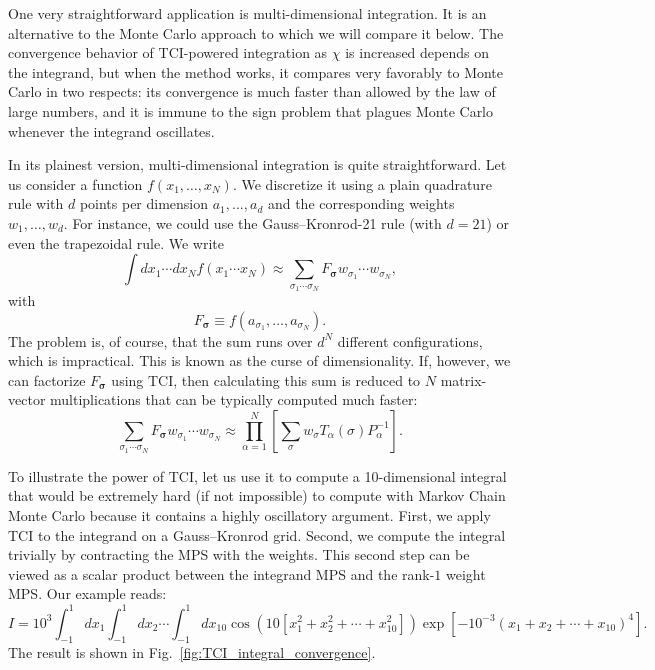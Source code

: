\documentclass{SciPost}
\begin{document}
One very straightforward application is multi-dimensional integration. It is an alternative to the Monte Carlo approach to which we will compare it below. The convergence behavior of TCI-powered integration as $\chi$ is increased depends on the integrand, but when the method works, it compares very favorably to Monte Carlo in two respects: its convergence is much faster than allowed by the law of large numbers, and it is immune to the sign problem that plagues Monte Carlo whenever the integrand oscillates.

In its plainest version, multi-dimensional integration is quite straightforward.
Let us consider a function $f(x_1,\ldots,x_N)$. We discretize it using a plain quadrature rule
with $d$ points per dimension $a_1, \ldots, a_d$ and the corresponding weights $w_1, \ldots, w_d$.
For instance, we could use the Gauss--Kronrod-21 rule (with $d=21$) or even the trapezoidal rule. We write
\begin{equation}
\int dx_1\cdots{}dx_N f(x_1\cdots{}x_N) \approx \sum_{\sigma_1\cdots{}\sigma_N} F_\mathbf{\sigma}
w_{\sigma_1}\cdots{}w_{\sigma_N},
\end{equation}
with
\begin{equation}
F_\mathbf{\sigma} \equiv f(a_{\sigma_1},\ldots,a_{\sigma_N}).
\end{equation}
The problem is, of course, that the sum runs over $d^N$ different configurations, which is impractical. This is known as the curse of dimensionality. If, however, we can factorize
$F_\mathbf{\sigma}$ using TCI, then calculating this sum is reduced to $N$ matrix-vector multiplications that can be typically computed much faster:
\begin{equation}
\sum_{\sigma_1\cdots{}\sigma_N} F_\mathbf{\sigma}
w_{\sigma_1}\cdots{}w_{\sigma_N} \approx
 \prod_{\alpha=1}^N \left[\sum_\sigma w_{\sigma} T_\alpha(\sigma) P_\alpha^{-1}\right].
\end{equation}

To illustrate the power of TCI, let us use it to compute a 10-dimensional integral that would be extremely hard (if not impossible) to compute with Markov Chain Monte Carlo because it contains a highly oscillatory argument. First, we apply TCI to the integrand on a Gauss--Kronrod grid. Second, we compute the integral trivially by contracting the MPS with the weights. This second step can be viewed as a scalar product between the integrand MPS and the rank-$1$ weight MPS. Our example reads:
\begin{equation}
\label{eq:10dIntegral}
    I =
    10^3 \int_{-1}^{1} dx_1\int_{-1}^{1}dx_2\cdots{}\int_{-1}^{1}dx_{10}
    \cos\!\left(10 [x^2_1+x^2_2+\cdots{}+x^2_{10}] \right)
    \exp\!\left[-10^{-3}\left( x_1+x_2+\cdots{}+x_{10} \right)^4\right].
\end{equation}
The result is shown in Fig.~\ref{fig:TCI_integral_convergence}.
\end{document}
